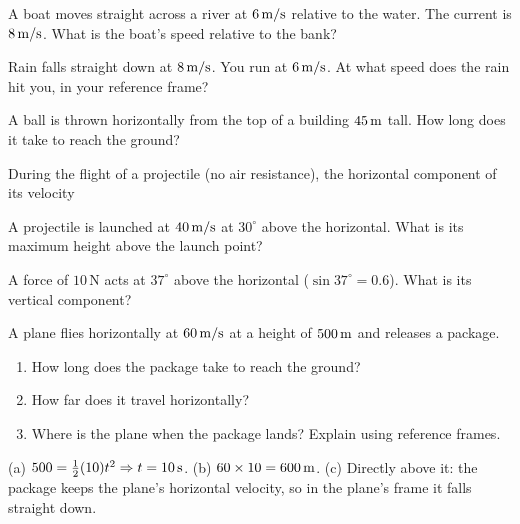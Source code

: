 \begin{exo}{}
A boat moves straight across a river at $6\,\mathrm{m/s}$ relative to the water. The current is $8\ms$. What is the boat's speed relative to the bank?
\choices{$14\ms$}{$2\ms$}{$10\ms$}{$48\ms$}
\end{exo}
\begin{exo}{}
Rain falls straight down at $8\ms$. You run at $6\,\mathrm{m/s}$. At what speed does the rain hit you, in your reference frame?
\choices{$2\ms$}{$10\ms$}{$14\ms$}{$8\ms$}
\end{exo}
\begin{exo}{}
A ball is thrown horizontally from the top of a building $45\,\mathrm{m}$ tall. How long does it take to reach the ground?
\choices{$3\s$}{$4.5\s$}{$9\s$}{$2\s$}
\end{exo}
\begin{exo}{}
During the flight of a projectile (no air resistance), the horizontal component of its velocity
\end{exo}
\begin{exo}{}
A projectile is launched at $40\,\mathrm{m/s}$ at $30^\circ$ above the horizontal. What is its maximum height above the launch point?
\choices{$20\m$}{$80\m$}{$40\m$}{$10\m$}
\end{exo}
\begin{exo}{}
A force of $10\,\mathrm{N}$ acts at $37^\circ$ above the horizontal ($\sin37^\circ=0.6$). What is its vertical component?
\end{exo}
\begin{exo}{}
A plane flies horizontally at $60\,\mathrm{m/s}$ at a height of $500\,\mathrm{m}$ and releases a package.
\begin{enumerate}[label=(\alph*)]
\item How long does the package take to reach the ground?
\item How far does it travel horizontally?
\item Where is the plane when the package lands? Explain using reference frames.
\end{enumerate}
\work{4.5cm}
\begin{solution}
(a) $500=\frac12(10)t^2\Rightarrow t=10\,\mathrm{s}$. \;(b) $60\times10=600\,\mathrm{m}$. \;(c) Directly above it: the package keeps the plane's horizontal velocity, so in the plane's frame it falls straight down.
\end{solution}
\end{exo}

